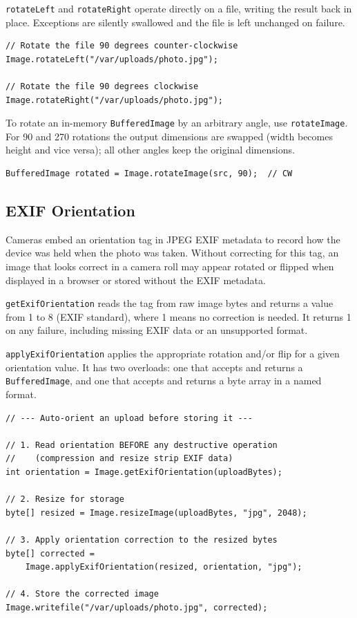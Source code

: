 \texttt{rotateLeft} and \texttt{rotateRight} operate directly on a file, writing the result back in place.  Exceptions are silently swallowed and the file is left unchanged on failure.

\begin{lstlisting}[style=java]
// Rotate the file 90 degrees counter-clockwise
Image.rotateLeft("/var/uploads/photo.jpg");

// Rotate the file 90 degrees clockwise
Image.rotateRight("/var/uploads/photo.jpg");
\end{lstlisting}

\noindent
To rotate an in-memory \texttt{BufferedImage} by an arbitrary angle, use \texttt{rotateImage}.  For 90\textdegree{} and 270\textdegree{} rotations the output dimensions are swapped (width becomes height and vice versa); all other angles keep the original dimensions.

\begin{lstlisting}[style=java]
BufferedImage rotated = Image.rotateImage(src, 90);  // CW
\end{lstlisting}

\subsection{EXIF Orientation}

Cameras embed an orientation tag in JPEG EXIF metadata to record how the device was held when the photo was taken.  Without correcting for this tag, an image that looks correct in a camera roll may appear rotated or flipped when displayed in a browser or stored without the EXIF metadata.

\texttt{getExifOrientation} reads the tag from raw image bytes and returns a value from 1 to 8 (EXIF standard), where 1 means no correction is needed.  It returns 1 on any failure, including missing EXIF data or an unsupported format.

\texttt{applyExifOrientation} applies the appropriate rotation and/or flip for a given orientation value.  It has two overloads: one that accepts and returns a \texttt{BufferedImage}, and one that accepts and returns a byte array in a named format.

\begin{lstlisting}[style=java]
// --- Auto-orient an upload before storing it ---

// 1. Read orientation BEFORE any destructive operation
//    (compression and resize strip EXIF data)
int orientation = Image.getExifOrientation(uploadBytes);

// 2. Resize for storage
byte[] resized = Image.resizeImage(uploadBytes, "jpg", 2048);

// 3. Apply orientation correction to the resized bytes
byte[] corrected =
    Image.applyExifOrientation(resized, orientation, "jpg");

// 4. Store the corrected image
Image.writefile("/var/uploads/photo.jpg", corrected);
\end{lstlisting}

